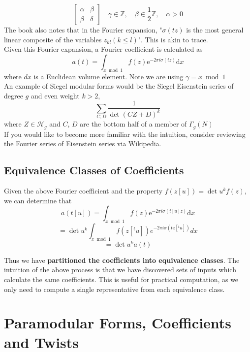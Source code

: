 \documentclass[11pt, oneside]{amsart}
\begin{document}
\[
\begin{bmatrix}
\alpha &	\beta \\
\beta & \delta
\end{bmatrix}
\quad  \gamma \in \mathbb{Z} ,\quad \beta \in \frac{1}{2} \mathbb{Z} ,\quad \alpha > 0
\]
The book also notes that in the Fourier expansion, "$\sigma(tz)$ is the most general linear composite of the variables $z_{kl}(k\leq l)$". This is akin to trace.\\
Given this Fourier expansion, a Fourier coefficient is calculated as $$a(t)=\int_{x \bmod 1} f(z) \mathrm{e}^{-2 \pi i \sigma(t z)} \mathrm{d} x$$
where $dx$ is a Euclidean volume element. Note we are using $\gamma = x\bmod 1$\\
An example of Siegel modular forms would be the Siegel Eisenstein series of degree $g$ and even weight $k>2$,
$$\sum_{C, D} \frac{1}{\operatorname{det}(C Z+D)^{k}}$$
where $Z\in \mathcal{H}_{g}$ and $C$, $D$ are the bottom half of a member of $\Gamma_g(N)$\\
If you would like to become more familiar with the intuition, consider reviewing the Fourier series of Eisenstein series via Wikipedia.
\subsection{Equivalence Classes of Coefficients}
Given the above Fourier coefficient and the property $f(z[u])=\operatorname{det} u^{k} f(z)$, we can determine that
$$a(t[u])=\int_{x \bmod 1} f(z) \mathrm{e}^{-2 \pi i \sigma(t[u] z)} \mathrm{d} x$$
$$=\operatorname{det} u^{k} \int_{x \bmod 1} f(z[^{t}u]) e^{-2 \pi i \sigma\left(t z\left[^{t} u\right]\right)} d x$$
$$=\operatorname{det} u^{k} a(t)$$
 
Thus we have \textbf{partitioned the coefficients into equivalence classes}. The intuition of the above process is that we have discovered sets of inputs which calculate the same coefficients. This is useful for practical computation, as we only need to compute a single representative from each equivalence class.

\section{Paramodular Forms, Coefficients and Twists}
\end{document}
